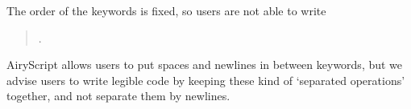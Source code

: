 The order of the keywords is fixed, so users are not able to write
\begin{quote}
  .
\end{quote}

AiryScript allows users to put spaces and newlines in between keywords, but we
advise users to write legible code by keeping these kind of ‘separated
operations’ together, and not separate them by newlines.






%
%





